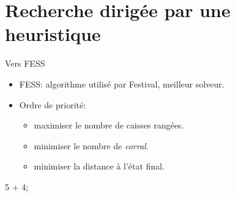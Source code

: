     \section{Recherche dirigée par une heuristique}
        \begin{frame}{Vers FESS}
            \begin{itemize}
                \item FESS: algorithme utilisé par Festival, meilleur solveur.
                \item Ordre de priorité:
                    \begin{itemize}
                        \item maximiser le nombre de caisses rangées.
                        \item minimiser le nombre de \textit{corral}.
                        \item minimiser la distance à l'état final.
                    \end{itemize}
            \end{itemize}
        \end{frame}

        \begin{interstateframe}
            \begin{interstatenv}{15}{5 + 4};\end{interstatenv}
        \end{interstateframe}


